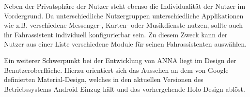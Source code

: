 Neben der Privatsphäre der Nutzer steht ebenso die Individualität der Nutzer im Vordergrund. Da unterschiedliche Nutzergruppen unterschiedliche Applikationen wie z.B. verschiedene Messenger-, Karten- oder Musikdienste nutzen, sollte auch ihr Fahrassistent individuell konfigurierbar sein. Zu diesem Zweck kann der Nutzer aus einer Liste verschiedene Module für seinen Fahrassistenten auswählen.

Ein weiterer Schwerpunkt bei der Entwicklung von \ac{ANNA} liegt im Design der Benutzeroberfläche. Hierzu orientiert sich das Aussehen an dem von Google definierten Material-Design, welches in den aktuellen Versionen des Betriebssystems Android Einzug hält und das vorhergehende Holo-Design ablöst.

